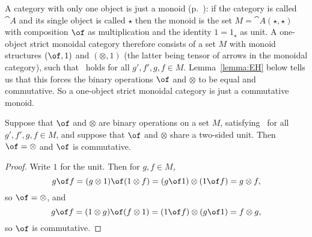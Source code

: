 \begin{example}	
A category with only one object is just a monoid
(p.~\pageref{p:degen-cat-monoid}): if the category is called $\cat{A}$ and
its single object is called $\star$ then the monoid is the set
$M = \cat{A}(\star, \star)$ with composition $\of$ as multiplication and the
identity $1 = 1_\star$ as unit.  A one-object strict monoidal%
%
%
category therefore
consists of a set $M$ with monoid structures $(\of, 1)$ and $(\otimes, 1)$
(the latter being tensor of arrows in the monoidal category), such
that~ holds for all $g', f', g, f \in M$.
Lemma~\ref{lemma:EH} below tells us that this forces the binary operations
$\of$ and $\otimes$ to be equal and commutative.  So a one-object strict
monoidal category is just a commutative%
%
%
monoid.
\end{example}

\begin{lemma}	%
%
%
Suppose that $\of$ and $\otimes$ are binary operations on a set $M$,
satisfying~ for all $g', f', g, f \in M$, and
suppose that $\of$ and $\otimes$ share a two-sided unit.  Then $\of =
\otimes$ and $\of$ is commutative.
\end{lemma}
%
\begin{proof}
Write $1$ for the unit.  Then for $g, f \in M$,
\[
g \of f
=
(g \otimes 1) \of (1 \otimes f)
=
(g \of 1) \otimes (1 \of f)
=
g \otimes f,
\]
so $\of = \otimes$, and 
\[
g \of f
=
(1 \otimes g) \of (f \otimes 1)
=
(1 \of f) \otimes (g \of 1)
=
f \otimes g,
\]
so $\of$ is commutative.  
\done
\end{proof}

